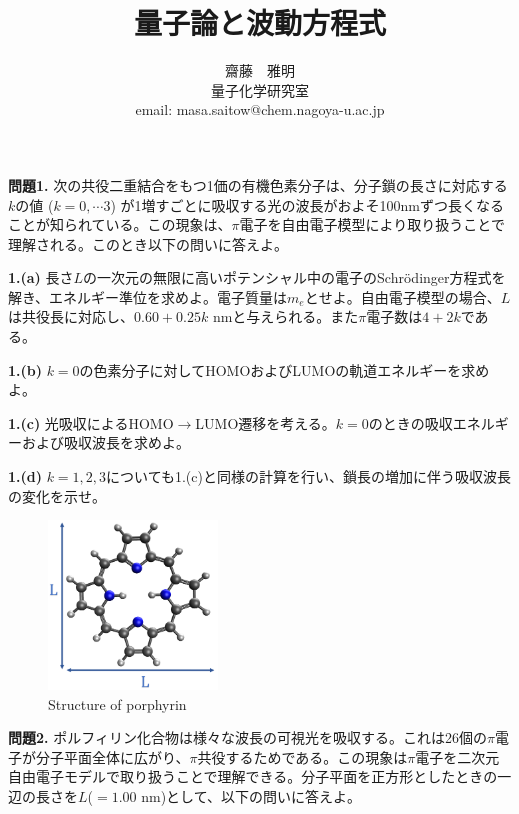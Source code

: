 \documentclass[12pt,pra,aps]{revtex4}
\begin{document}
\title{量子論と波動方程式}
\author{齋藤　雅明 \\ 量子化学研究室 \\ email: masa.saitow@chem.nagoya-u.ac.jp}

\maketitle

\noindent
{\bf 問題1.} 次の共役二重結合をもつ1価の有機色素分子は、分子鎖の長さに対応する$k$の値 ($k=0,\cdots 3$) が1増すごとに吸収する光の波長がおよそ100nmずつ長くなることが知られている。この現象は、$\pi$電子を自由電子模型により取り扱うことで理解される。このとき以下の問いに答えよ。
    
%

\noindent
{\bf 1.(a)} 長さ$L$の一次元の無限に高いポテンシャル中の電子のSchr\"odinger方程式を解き、エネルギー準位を求めよ。電子質量は$m_e$とせよ。自由電子模型の場合、$L$は共役長に対応し、$0.60+0.25k$ nmと与えられる。また$\pi$電子数は$4+2k$である。

\noindent
{\bf 1.(b)} $k=0$の色素分子に対してHOMOおよびLUMOの軌道エネルギーを求めよ。

\noindent
{\bf 1.(c)} 光吸収によるHOMO$\rightarrow$LUMO遷移を考える。$k=0$のときの吸収エネルギーおよび吸収波長を求めよ。

\noindent
{\bf 1.(d)} $k=1,2,3$についても1.(c)と同様の計算を行い、鎖長の増加に伴う吸収波長の変化を示せ。

\begin{figure}
  \centering
  \includegraphics[width=4.5cm]{porph1.png}
  \caption{Structure of porphyrin}
\end{figure}

\noindent
{\bf 問題2.} ポルフィリン化合物は様々な波長の可視光を吸収する。これは26個の$\pi$電子が分子平面全体に広がり、$\pi$共役するためである。この現象は$\pi$電子を二次元自由電子モデルで取り扱うことで理解できる。分子平面を正方形としたときの一辺の長さを$L$($=1.00$ nm)として、以下の問いに答えよ。
\end{document}
